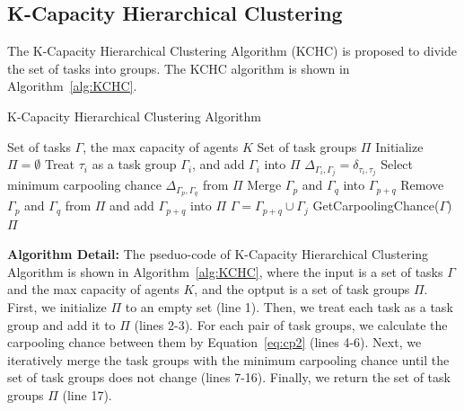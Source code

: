 \documentclass[sigconf,anonymous]{aamas}
\begin{document}



\subsection{K-Capacity Hierarchical Clustering}




The K-Capacity Hierarchical Clustering Algorithm (KCHC)
is proposed to divide the set of tasks into groups.
The KCHC algorithm is shown in Algorithm~\ref{alg:KCHC}.

\begin{algorithm}[htbp]
\caption{K-Capacity Hierarchical Clustering Algorithm}
\label{alg:KCHC}

\begin{algorithmic}[1]
\Require Set of tasks $\Gamma$, the max capacity of agents $K$ %
\Ensure Set of task groups ${\Pi}$ %
\State Initialize ${\Pi} = \emptyset$
    \State Treat $\tau_{i}$ as a task group $\Gamma_{i}$, and add $\Gamma_{i}$ into ${\Pi}$
        \State $\Delta_{\Gamma_i, \Gamma_j} = \delta_{\tau_i, \tau_j}$
    \EndFor
\EndFor
{}
    \State Select minimum carpooling chance $\Delta_{\Gamma_p, \Gamma_q}$ from $\Pi$
    \State Merge $\Gamma_p$ and $\Gamma_q$ into $\Gamma_{p+q}$
    \State Remove $\Gamma_p$ and $\Gamma_q$ from $\Pi$ and add $\Gamma_{p+q}$ into $\Pi$
            \State $\Gamma = \Gamma_{p+q} \cup \Gamma_j$
            \State GetCarpoolingChance($\Gamma$)
        \EndIf
    \EndFor
\EndWhile
\State \Return $\Pi$
\end{algorithmic}
\end{algorithm}

\textbf{Algorithm Detail:}
The pseduo-code of K-Capacity Hierarchical Clustering Algorithm is shown in Algorithm~\ref{alg:KCHC},
where the input is a set of tasks $\Gamma$ and the max capacity of agents $K$,
and the optput is a set of task groups $\Pi$.
First, we initialize $\Pi$ to an empty set (line 1).
Then, we treat each task as a task group and add it to $\Pi$ (lines 2-3).
For each pair of task groups, 
we calculate the carpooling chance between them by Equation~\ref{eq:cp2} (lines 4-6).
Next, we iteratively merge the task groups with the minimum carpooling chance 
until the set of task groups does not change (lines 7-16).
Finally, we return the set of task groups $\Pi$ (line 17).
\end{document}
